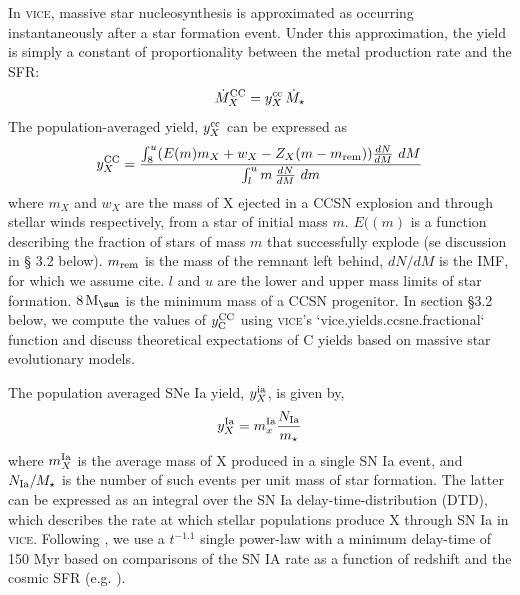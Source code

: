 \documentclass[fleqn,
usenatbib]{mnras}
\newcommand{\VICE}{\textsc{vice}}
\newcommand{\Ycc}{{y_{\rm C}^{\rm CC}}}
\newcommand{\Mo}{ {\rm M}_{\sun}}
\newcommand{\dbadd}[1]{{\color{Thistle} #1}}
\begin{document}
In \VICE, massive star nucleosynthesis is approximated as occurring instantaneously after a star formation event. Under this approximation, the yield is simply a constant  of proportionality between the metal production rate and the SFR:
\begin{equation}
    \dot{M}_X^{\rm CC} = y_{X}^{\rm cc}\, \dot{M}_\star
\end{equation}
The population-averaged yield, $y_{X}^{\rm cc}$ can be expressed as
\begin{equation}
y_{X}^{\rm CC} = \frac{
\int_8^u (E(m) m_X + w_X - Z_X(m - m_{\rm rem}) )\frac{dN}{dM}\ dM
}{
\int_l^u m\,\frac{dN}{dM}\ dm
}
\end{equation}
where $m_X$ and $w_X$ are the mass of X ejected in a CCSN explosion and through stellar winds respectively, from a star of initial mass $m$. $E((m)$ is a function describing the fraction of stars of mass $m$ that successfully explode (se discussion in \S \dbadd{3.2} below). $m_{\rm rem}$ is the mass of the remnant left behind, $dN/dM$ is the IMF, for which we assume \dbadd{cite}. $l$ and $u$ are the lower and upper mass limits of star formation. $8\,\Mo$ is the minimum mass of a CCSN progenitor. In section \S 3.2 below, we compute the values of $\Ycc$ using \VICE's `vice.yields.ccsne.fractional` function and discuss theoretical expectations of C yields based on massive star evolutionary models. 


The population averaged SNe Ia yield, $y_{X}^{\rm ia}$, is given by,
\begin{equation}
    y_{X}^{\rm Ia} = m_{x}^{\rm Ia} \frac{N_{\rm Ia}}{m_\star}
\end{equation}
where $m_{X}^{\rm Ia}$ is the average mass of X produced in a single SN Ia event, and $N_{\rm Ia} / M_\star$ is the number of such events per unit mass of star formation. The latter can be expressed as an integral over the SN Ia delay-time-distribution (DTD), which describes the rate at which stellar populations produce X through SN Ia in \VICE. Following \citet{james+23}, we use a $t^{-1.1}$ single power-law with a minimum delay-time of 150 Myr based on comparisons of the SN IA rate as a function of redshift and the cosmic SFR (e.g. \citealt{maoz+12}). 
\end{document}
